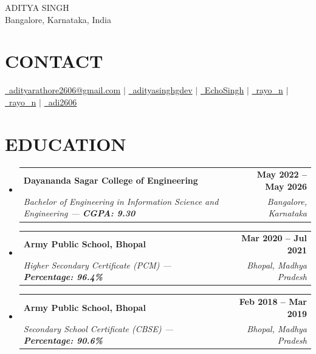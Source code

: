 \documentclass[letterpaper,10pt]{article}
\makeatletter
\newcommand{\resumeSubHeadingListStart}{\begin{itemize}[leftmargin=0.15in,label={}]}
\newcommand{\resumeSubHeadingListEnd}{\end{itemize}}
\newcommand{\resumeSubheading}[4]{%
  \item
  \begin{tabular*}{1.0\textwidth}[t]{l@{\extracolsep{\fill}}r}
    \textbf{#1} & {\small\bfseries #2} \\
    \textit{\color{primary} #3} & {\textit{\color{primary} #4}} \\
  \end{tabular*}\vspace{-2pt}
}
\makeatother
\begin{document}
\begin{center}
    {\Huge \scshape ADITYA SINGH} \\[6pt]
    \large Bangalore, Karnataka, India \\[8pt]
\end{center}

\section{CONTACT}
\begin{center}
\small
\href{mailto:adityarathore2606@gmail.com}{\raisebox{-0.1\height}{\faEnvelope}\ adityarathore2606@gmail.com} $|$
\href{https://linkedin.com/in/adityasinghgdev}{\raisebox{-0.1\height}{\faLinkedin}\ adityasinghgdev} $|$
\href{https://github.com/EchoSingh}{\raisebox{-0.1\height}{\faGithub}\ EchoSingh} $|$
\href{https://www.leetcode.com/rayo_n}{\ rayo\_n} $|$
\href{https://www.hackerrank.com/profile/rayo_n}{\ rayo\_n} $|$
\href{https://www.kaggle.com/adi2606}{\ adi2606} 
\end{center}

\section{EDUCATION}
\vspace{5 pt}
  \resumeSubHeadingListStart
    \resumeSubheading
      {Dayananda Sagar College of Engineering}{May 2022 -- May 2026}
      {Bachelor of Engineering in Information Science and Engineering --- \textbf{CGPA: 9.30}}{Bangalore, Karnataka}
    \resumeSubheading
      {Army Public School, Bhopal}{Mar 2020 -- Jul 2021}
      {Higher Secondary Certificate (PCM) --- \textbf{Percentage: 96.4\%}}{Bhopal, Madhya Pradesh}
    \resumeSubheading
      {Army Public School, Bhopal}{Feb 2018 -- Mar 2019}
      {Secondary School Certificate (CBSE) --- \textbf{Percentage: 90.6\%}}{Bhopal, Madhya Pradesh}
  \resumeSubHeadingListEnd
\end{document}
